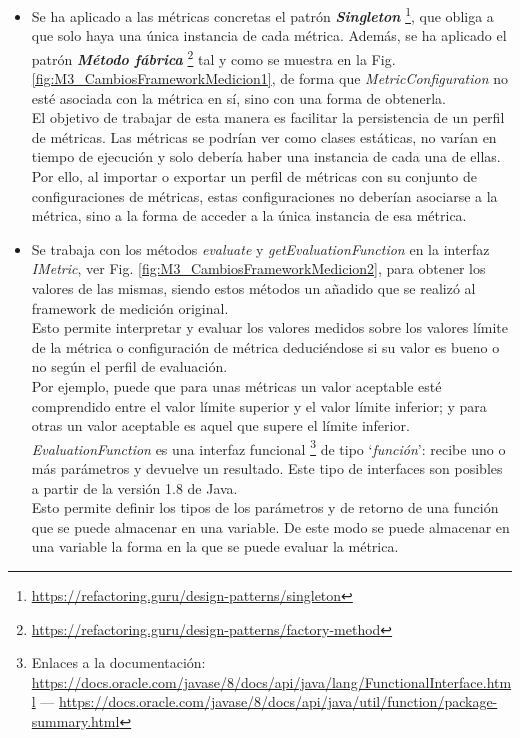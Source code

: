 \begin{itemize}
	\tightlist
	\item Se ha aplicado a las métricas concretas el patrón \textit{\textbf{Singleton}} \footnote{\url{https://refactoring.guru/design-patterns/singleton}}, que obliga a que solo haya una única instancia de cada métrica. Además, se ha aplicado el patrón \textit{\textbf{Método fábrica}} \footnote{\url{https://refactoring.guru/design-patterns/factory-method}} tal y como se muestra en la Fig. \ref{fig:M3_CambiosFrameworkMedicion1}, de forma que \textit{MetricConfiguration} no esté asociada con la métrica en sí, sino con una forma de obtenerla.\\
	El objetivo de trabajar de esta manera es facilitar la persistencia de un perfil de métricas. Las métricas se podrían ver como clases estáticas, no varían en tiempo de ejecución y solo debería haber una instancia de cada una de ellas. Por ello, al importar o exportar un perfil de métricas con su conjunto de configuraciones de métricas, estas configuraciones no deberían asociarse a la métrica, sino a la forma de acceder a la única instancia de esa métrica. 
	\item Se trabaja con los métodos \textit{evaluate} y \textit{getEvaluationFunction} en la interfaz \textit{IMetric}, ver Fig. \ref{fig:M3_CambiosFrameworkMedicion2}, para obtener los valores de las mismas, siendo estos métodos un añadido que se realizó al framework de medición original.\\
	Esto permite interpretar y evaluar los valores medidos sobre los valores límite de la métrica o configuración de métrica deduciéndose si su valor es bueno o no según el perfil de evaluación.\\
	 Por ejemplo, puede que para unas métricas un valor aceptable esté comprendido entre el valor límite superior y el valor límite inferior; y para otras un valor aceptable es aquel que supere el límite inferior.\\
	\textit{EvaluationFunction} es una interfaz funcional \footnote{Enlaces a la documentación: \url{https://docs.oracle.com/javase/8/docs/api/java/lang/FunctionalInterface.html} --- \url{https://docs.oracle.com/javase/8/docs/api/java/util/function/package-summary.html}} 
	de tipo `\textit{función}': recibe uno o más parámetros y devuelve un resultado. Este tipo de interfaces son posibles a partir de la versión 1.8 de Java.\\
	Esto permite definir los tipos de los parámetros y de retorno de una función que se puede almacenar en una variable. De este modo se puede almacenar en una variable la forma en la que se puede evaluar la métrica.
\end{itemize}

